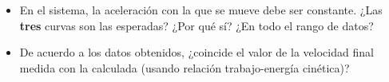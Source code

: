 \begin{enumerate}
\begin{itemize}
\begin{figure}[H]
					\label{fig:ace_vs_tmp}
				\end{figure}
			\item En el sistema,
				la aceleración con la que se mueve debe ser constante.
				¿Las \textbf{tres} curvas son las esperadas?
				¿Por qué sí?
				¿En todo el rango de datos?
			\item De acuerdo a los datos obtenidos,
				¿coincide el valor de la velocidad final medida con la calculada
				(usando relación trabajo-energía cinética)?
		\end{itemize}
\end{enumerate}
